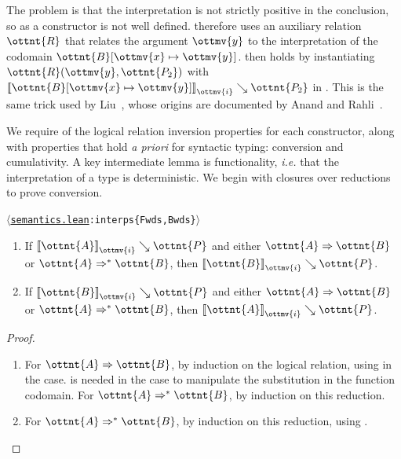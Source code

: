 \documentclass[a4paper,UKenglish,cleveref,autoref,thm-restate]{lipics-v2021}
\makeatletter
\newcommand{\citep}[1]{\cite{#1}}
\newcommand{\repo}{https://github.com/ionathanch/TTBFL}
\newcommand{\ie}{\textit{i.e.}\@\xspace}
\newcommand{\apriori}{\textit{a priori}\@\xspace}
\newcommand{\thmref}[2]{%
  $\langle$\href{\repo/tree/main/src/#1}{\texttt{#1}}\texttt{:#2}$\rangle$%
}
\makeatother
\begin{document}
The problem is that the interpretation is not strictly positive in the conclusion,
so  as a constructor is not well defined.
 therefore uses an auxiliary relation $\ottnt{R}$
that relates the argument $\ottmv{y}$ to the interpretation of the codomain $ \ottnt{B} [  \ottmv{x}  \mapsto  \ottmv{y}  ] $.
 then holds by instantiating $ \ottnt{R} ( \ottmv{y} ,  \ottnt{P_{{\mathrm{2}}}} ) $ with $ \mathopen{\llbracket}   \ottnt{B} [  \ottmv{x}  \mapsto  \ottmv{y}  ]   \mathclose{\rrbracket}_{ \ottmv{i} } \searrow  \ottnt{P_{{\mathrm{2}}}} $ in .
This is the same trick used by Liu~\citep{lr-pearl},
whose origins are documented by Anand and Rahli~\citep{mech-nuprl}.

We require of the logical relation inversion properties for each constructor,
along with properties that hold \apriori for syntactic typing:
conversion and cumulativity.
A key intermediate lemma is functionality,
\ie that the interpretation of a type is deterministic.
We begin with closures over reductions to prove conversion.

\begin{lemma} \thmref{semantics.lean}{interps\{Fwds,Bwds\}} \label{lem:lr:pars} ~
  \begin{enumerate}[topsep=0pt]
    \item If $ \mathopen{\llbracket}  \ottnt{A}  \mathclose{\rrbracket}_{ \ottmv{i} } \searrow  \ottnt{P} $ and either $ \ottnt{A}  \Rightarrow  \ottnt{B} $ or $ \ottnt{A}  \Rightarrow^\ast  \ottnt{B} $,
      then $ \mathopen{\llbracket}  \ottnt{B}  \mathclose{\rrbracket}_{ \ottmv{i} } \searrow  \ottnt{P} $.
    \item If $ \mathopen{\llbracket}  \ottnt{B}  \mathclose{\rrbracket}_{ \ottmv{i} } \searrow  \ottnt{P} $ and either $ \ottnt{A}  \Rightarrow  \ottnt{B} $ or $ \ottnt{A}  \Rightarrow^\ast  \ottnt{B} $,
      then $ \mathopen{\llbracket}  \ottnt{A}  \mathclose{\rrbracket}_{ \ottmv{i} } \searrow  \ottnt{P} $.
  \end{enumerate}
\end{lemma}

\begin{proof} ~
  \begin{enumerate}[topsep=0pt]
    \item For $ \ottnt{A}  \Rightarrow  \ottnt{B} $, by induction on the logical relation,
      using  in the  case.
       is needed in the  case
      to manipulate the substitution in the function codomain.
      For $ \ottnt{A}  \Rightarrow^\ast  \ottnt{B} $, by induction on this reduction.
    \item For $ \ottnt{A}  \Rightarrow^\ast  \ottnt{B} $, by induction on this reduction,
      using . \qedhere
  \end{enumerate}
\end{proof}
\end{document}
